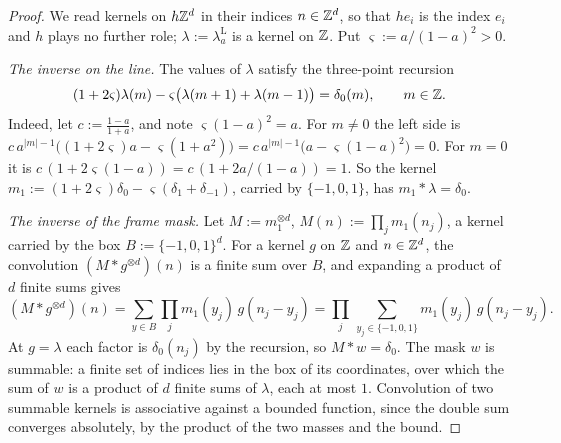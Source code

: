 \begin{proof}
\leanok
We read kernels on $h\mathbb{Z}^d$ in their indices $n \in \mathbb{Z}^d$, so that $he_i$ is the index $e_i$ and
$h$ plays no further role; $\lambda := \lambda^{\mathrm L}_a$ is a kernel on $\mathbb{Z}$. Put
$\varsigma := a/(1-a)^2 > 0$.

\emph{The inverse on the line.} The values of $\lambda$ satisfy the three-point recursion
\[
(1 + 2\varsigma)\lambda(m) - \varsigma\bigl(\lambda(m+1) + \lambda(m-1)\bigr) = \delta_0(m),
\qquad m \in \mathbb{Z} .
\]
Indeed, let $c := \tfrac{1-a}{1+a}$, and note $\varsigma(1-a)^2 = a$. For $m \ne 0$ the left side
is $c\,a^{|m|-1}\bigl((1 + 2\varsigma)a - \varsigma(1 + a^2)\bigr) = c\,a^{|m|-1}\bigl(a -
\varsigma(1-a)^2\bigr) = 0$. For $m = 0$ it is $c\,(1 + 2\varsigma(1-a)) = c\,(1 + 2a/(1-a)) = 1$.
So the kernel $m_1 := (1 + 2\varsigma)\delta_0 - \varsigma(\delta_1 + \delta_{-1})$, carried by
$\{-1, 0, 1\}$, has $m_1 * \lambda = \delta_0$.

\emph{The inverse of the frame mask.} Let $M := m_1^{\otimes d}$, $M(n) := \prod_jm_1(n_j)$, a
kernel carried by the box $B := \{-1, 0, 1\}^d$. For a kernel $g$ on $\mathbb{Z}$ and $n \in \mathbb{Z}^d$, the
convolution $(M * g^{\otimes d})(n)$ is a finite sum over $B$, and expanding a product of $d$ finite
sums gives
\[
(M * g^{\otimes d})(n) = \sum_{y \in B}\prod_jm_1(y_j)\,g(n_j - y_j)
= \prod_j\,\sum_{y_j \in \{-1, 0, 1\}}m_1(y_j)\,g(n_j - y_j) .
\]
At $g = \lambda$ each factor is $\delta_0(n_j)$ by the recursion, so $M * w = \delta_0$. The mask
$w$ is summable: a finite set of indices lies in the box of its coordinates, over which the sum of
$w$ is a product of $d$ finite sums of $\lambda$, each at most $1$. Convolution of two summable
kernels is associative against a bounded function, since the double sum converges absolutely,
by the product of the two masses and the bound.


\end{proof}
